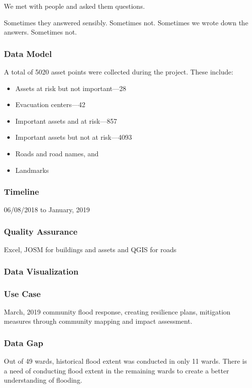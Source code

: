 \documentclass[a4paper,12pt,twoside]{article}
\begin{document}
We met with people and asked them questions.

Sometimes they answered sensibly. Sometimes not. Sometimes we wrote down the answers. Sometimes not.

\subsubsection{Data Model}

A total of 5020 asset points were collected during the project. These include:
\begin{itemize}
    \item Assets at risk but not important---28 
    \item Evacuation centers---42
    \item Important assets and at risk---857
    \item Important assets but not at risk---4093
    \item Roads and road names, and
    \item Landmarks
\end{itemize}

\subsubsection{Timeline}
06/08/2018 to January, 2019

\subsubsection{Quality Assurance}
Excel, JOSM for buildings and assets and QGIS for roads

\subsubsection{Data Visualization}

\subsubsection{Use Case}
March, 2019 community flood response, creating resilience plans, mitigation measures through community mapping and impact assessment.

\subsubsection{Data Gap}
Out of 49 wards, historical flood extent was conducted in only 11 wards. There is a need of conducting flood extent in the remaining wards to create a better understanding of flooding.
\end{document}
